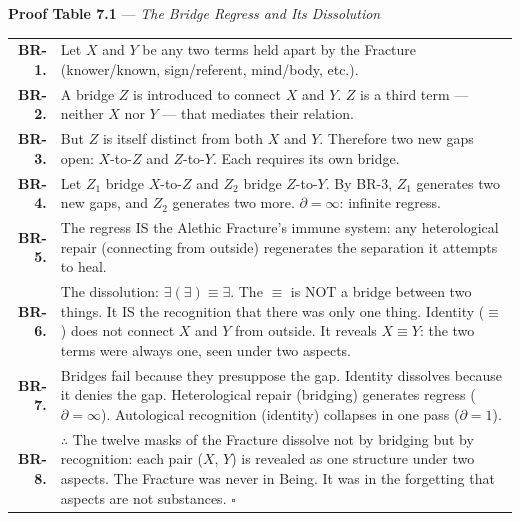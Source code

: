 \documentclass[10pt, openany, oneside]{book}
\renewcommand{\footnotesize}{\fontsize{8.5}{11}\selectfont}
\begin{document}
\textbf{Proof Table 7.1} --- \textit{The Bridge Regress and Its Dissolution}

\vspace{0.5em}

{\footnotesize
\noindent\begin{tabular}{r p{}}
\textbf{BR-1.} & Let $X$ and $Y$ be any two terms held apart by the Fracture (knower/known, sign/referent, mind/body, etc.). \\[0.3em]
\textbf{BR-2.} & A bridge $Z$ is introduced to connect $X$ and $Y$. $Z$ is a third term --- neither $X$ nor $Y$ --- that mediates their relation. \\[0.3em]
\textbf{BR-3.} & But $Z$ is itself distinct from both $X$ and $Y$. Therefore two new gaps open: $X$-to-$Z$ and $Z$-to-$Y$. Each requires its own bridge. \\[0.3em]
\textbf{BR-4.} & Let $Z_1$ bridge $X$-to-$Z$ and $Z_2$ bridge $Z$-to-$Y$. By BR-3, $Z_1$ generates two new gaps, and $Z_2$ generates two more. $\partial = \infty$: infinite regress. \\[0.3em]
\textbf{BR-5.} & The regress IS the Alethic Fracture's immune system: any heterological repair (connecting from outside) regenerates the separation it attempts to heal. \\[0.3em]
\textbf{BR-6.} & The dissolution: $\exists(\exists) \equiv \exists$. The $\equiv$ is NOT a bridge between two things. It IS the recognition that there was only one thing. Identity ($\equiv$) does not connect $X$ and $Y$ from outside. It reveals $X \equiv Y$: the two terms were always one, seen under two aspects. \\[0.3em]
\textbf{BR-7.} & Bridges fail because they presuppose the gap. Identity dissolves because it denies the gap. Heterological repair (bridging) generates regress ($\partial = \infty$). Autological recognition (identity) collapses in one pass ($\partial = 1$). \\[0.3em]
\textbf{BR-8.} & $\therefore$ The twelve masks of the Fracture dissolve not by bridging but by recognition: each pair ($X$, $Y$) is revealed as one structure under two aspects. The Fracture was never in Being. It was in the forgetting that aspects are not substances. $\square$ \\[0.3em]
\end{tabular}
}

\vspace{1.5em}

\end{document}
